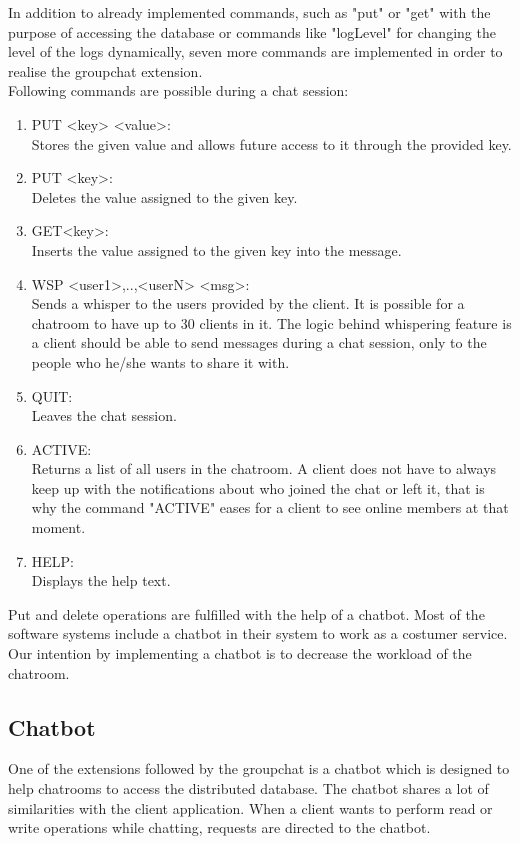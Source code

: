 In addition to already implemented commands, such as "put" or "get" with the purpose of accessing the database or commands like "logLevel" for changing the level of the logs dynamically, seven more commands are implemented in order to realise the groupchat extension.\\
Following commands are possible during a chat session:
\begin{enumerate}
  \item 	PUT <key> <value>: \\
Stores the given value and allows future access to it through the provided key. 
  \item PUT <key>:\\
Deletes the value assigned to the given key.
  \item GET{<key>}:\\
Inserts the value assigned to the given key into the message.
  \item WSP <user1>,..,<userN> <msg>:\\
Sends a whisper to the users provided by the client. It is possible for a chatroom to have     up to 30 clients in it. The logic behind whispering feature is a client should be able to send messages during a chat session, only to the people who he/she wants to share it with.  
  \item QUIT:\\
  Leaves the chat session.
  \item ACTIVE:\\
   Returns a list of all users in the chatroom. A client does not have to always keep up with the notifications about who joined the chat or left it, that is why the command "ACTIVE" eases for a client to see online members at that moment.
  \item HELP:\\
  Displays the help text.
\end{enumerate}
Put and delete operations are fulfilled with the help of a chatbot. Most of the software systems include a chatbot in their system to work as a costumer service. Our intention by implementing a chatbot is to decrease the workload of the chatroom.

\subsection{Chatbot}
\label{sec:groupchat_chatbot}
One of the extensions followed by the groupchat is a chatbot which is designed to help chatrooms to access the distributed database. The chatbot shares a lot of similarities with the client application. When a client wants to perform read or write operations while chatting, requests are directed to the chatbot.


